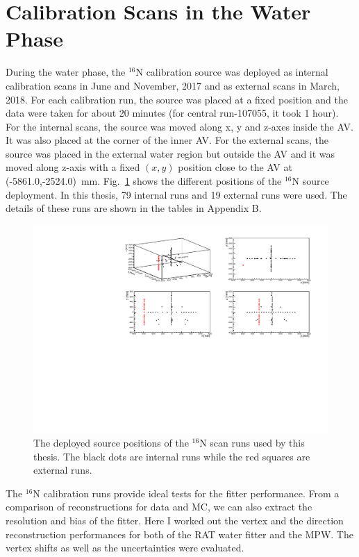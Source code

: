 \section{ Calibration Scans in the Water Phase}\label{sect:n16_water}
During the water phase, the $^{16}$N calibration source was deployed as internal calibration scans in June and November, 2017 and as external scans in March, 2018. For each calibration run, the source was placed at a fixed position and the data were taken for about 20 minutes (for central run-107055, it took 1 hour). For the internal scans, the source was moved along x, y and z-axes inside the AV. It was also placed at the corner of the inner AV. For the external scans, the source was placed in the external water region but outside the AV and it was moved along z-axis with a fixed $(x,y)$ position close to the AV at (-5861.0,-2524.0)~mm. Fig.~\ref{N16_3Dscan} shows the different positions of the $^{16}$N source deployment. In this thesis, 79 internal runs and 19 external runs were used. The details of these runs are shown in the tables in Appendix B.

\begin{figure}[!htb]
	\centering
	\includegraphics[width=15cm]{N16_3Dscan.pdf}
	\caption{The deployed source positions of the $^{16}$N scan runs used by this thesis. The black dots are internal runs while the red squares are external runs.}
	\label{N16_3Dscan}
\end{figure}

The $^{16}$N calibration runs provide ideal tests for the fitter performance. From a comparison of reconstructions for data and MC, we can also extract the resolution and bias of the fitter. Here I worked out the vertex and the direction reconstruction performances for both of the RAT water fitter and the MPW. The vertex shifts as well as the uncertainties were evaluated. 

